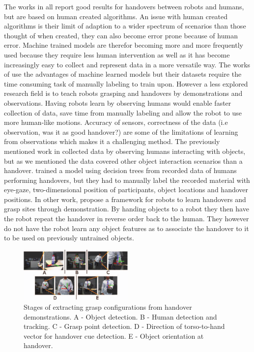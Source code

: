 The works in \parencite{Aleotti2012} \parencite{Suay2015} \parencite{Kim2004} all report good results for handovers between robots and humans, but are based on human created algorithms. An issue with human created algorithms is their limit of adaption to a wider spectrum of scenarios than those thought of when created, they can also become error prone because of human error. Machine trained models are therefor becoming more and more frequently used because they require less human intervention as well as it has become increasingly easy to collect and represent data in a more versatile way. The works of \parencite{Redmon2014} \parencite{Lenz2015} \parencite{Jiang2011} \textcite{Huebner2008a} use the advantages of machine learned models but their datasets require the time consuming task of manually labeling to train upon. However a less explored research field is to teach robots grasping and handovers by demonstrations and observations. Having robots learn by observing humans would enable faster collection of data, save time from manually labeling and allow the robot to use more human-like motions. Accuracy of sensors, correctness of the data (i.e observation, was it as good handover?) are some of the limitations of learning from observations which makes it a challenging method. The previously mentioned work in \parencite{Chan2014} collected data by observing humans interacting with objects, but as we mentioned the data covered other object interaction scenarios than a handover. \textcite{Strabala2013} trained a model using decision trees from recorded data of humans performing handovers, but they had to manually label the recorded material with eye-gaze, two-dimensional position of participants, object locations and handover positions. In other work, \textcite{Chan2015a} propose a framework for robots to learn handovers and grasp sites through demonstration. By handing objects to a robot they then have the robot repeat the handover in reverse order back to the human. They however do not have the robot learn any object features as to associate the handover to it to be used on previously untrained objects.

\begin{figure}
	\centering
	\includegraphics[width=0.5\textwidth]{img/related-work/demonstrations.png}
	\caption{Stages of extracting grasp configurations from handover demonstrations. A - Object detection. B - Human detection and tracking. C - Grasp point detection. D - Direction of torso-to-hand vector for handover cue detection. E - Object orientation at handover.}
\end{figure}

